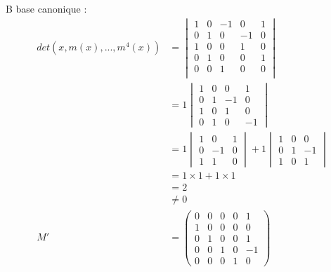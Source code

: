 \documentclass{article}
\begin{document}
B base canonique : \begin{align*}
    det(x, m(x),...,m^4(x)) &= \begin{vmatrix}
        1 & 0 & -1 & 0 & 1\\
        0 & 1 & 0 & -1 & 0\\
        1& 0& 0 & 1 & 0 \\
        0& 1& 0 & 0 & 1\\
        0& 0& 1& 0 & 0\\
    \end{vmatrix}\\
    &= 1 \begin{vmatrix}
        1 & 0 & 0 & 1\\
        0 & 1 & -1 & 0\\
        1& 0 & 1 & 0 \\
        0& 1 & 0 & -1
    \end{vmatrix}\\
    &=1\begin{vmatrix}
        1 & 0 & 1 \\ 0 & -1& 0 \\ 1&1&0
    \end{vmatrix}
    + 1 \begin{vmatrix}
        1 & 0 & 0 \\ 0 & 1 & -1 \\ 1& 0 & 1
    \end{vmatrix}\\
    &= 1\times 1 + 1 \times 1\\
    &= 2 \\
    &\neq 0\\
    M' &= \begin{pmatrix}
        0 & 0 & 0 & 0 & 1\\
        1 & 0 & 0 & 0 & 0 \\
        0 & 1 & 0 & 0 & 1\\
        0 & 0 & 1 & 0 & -1\\
        0 & 0 & 0 & 1 & 0
    \end{pmatrix}
\end{align*}
\end{document}
